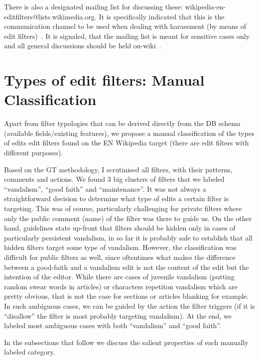 There is also a designated mailing list for discussing these: wikipedia-en-editfilters@lists.wikimedia.org.
It is specifically indicated that this is the communication channel to be used when dealing with harassment (by means of edit filters)~\cite{Wikipedia:EditFilter}.
It is signaled, that the mailing list is meant for sensitive cases only and all general discussions should be held on-wiki~\cite{Wikipedia:EditFilter}.


\section{Types of edit filters: Manual Classification}
\label{sec:manual-classification}

Apart from filter typologies that can be derived directly from the DB schema (available fields/existing features), we propose a manual classification of the types of edits edit filters found on the EN Wikipedia target (there are edit filters with different purposes).

Based on the GT methodology, I scrutinised all filters, with their patterns, comments and actions. %
We found 3 big clusters of filters that we labeled ``vandalism'', ``good faith'' and ``maintenance''.
It was not always a straightforward decision to determine what type of edits a certain filter is targeting.
This was of course, particularly challenging for private filters where only the public comment (name) of the filter was there to guide us.
On the other hand, guidelines state up-front that filters should be hidden only in cases of particularly persistent vandalism, in so far it is probably safe to establish that all hidden filters target some type of vandalism.
However, the classification was difficult for public filters as well, since oftentimes what makes the difference between a good-faith and a vandalism edit is not the content of the edit but the intention of the editor.
While there are cases of juvenile vandalism (putting random swear words in articles) or characters repetiton vandalism which are pretty obvious, that is not the case for sections or articles blanking for example. %
In such ambiguous cases, we can be guided by the action the filter triggers (if it is ``disallow'' the filter is most probably targeting vandalism).
At the end, we labeled most ambiguous cases with both ``vandalism'' and ``good faith''.

In the subsections that follow we discuss the salient properties of each manually labeled category.

